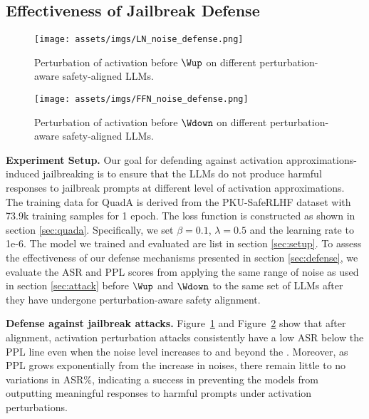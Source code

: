 \subsection{Effectiveness of Jailbreak Defense} \label{sec:jailbreak_defense}
\begin{figure*}[!h]
    \centering
    \texttt{[image: assets/imgs/LN\_noise\_defense.png]}
    \caption{Perturbation of activation before $\Wup$ on different perturbation-aware safety-aligned LLMs.}
    \label{fig:ln_noise_defense}
\end{figure*}

\begin{figure*}[!h]
    \centering
    \texttt{[image: assets/imgs/FFN\_noise\_defense.png]}
    \caption{Perturbation of activation before $\Wdown$ on different perturbation-aware safety-aligned LLMs.}
    \label{fig:ffn_noise_defense}
\end{figure*}
\noindent \textbf{Experiment Setup.}
Our goal for defending against activation approximations-induced jailbreaking is to ensure that the LLMs do not produce harmful responses to jailbreak prompts at different level of activation approximations. The training data for QuadA is derived from the PKU-SafeRLHF dataset \cite{dai2023safe} with 73.9k training samples for 1 epoch. The loss function is constructed as shown in section \ref{sec:quada}. Specifically, we set $\beta = 0.1$, $\lambda = 0.5$ and the learning rate to 1e-6. The model we trained and evaluated are list in section \ref{sec:setup}. To assess the effectiveness of our defense mechanisms presented in section \ref{sec:defense}, we evaluate the ASR and PPL scores from applying the same range of noise as used in section \ref{sec:attack} before $\Wup$ and $\Wdown$ to the same set of LLMs after they have undergone perturbation-aware safety alignment. 

\textbf{Defense against jailbreak attacks.}
Figure~\ref{fig:ln_noise_defense} and Figure~\ref{fig:ffn_noise_defense} show that after alignment, activation perturbation attacks consistently have a low ASR below the PPL line even when the noise level increases to and beyond the \mva. Moreover, as PPL grows exponentially from the increase in noises, there remain little to no variations in ASR\%, indicating a success in preventing the models from outputting meaningful responses to harmful prompts under activation perturbations.



